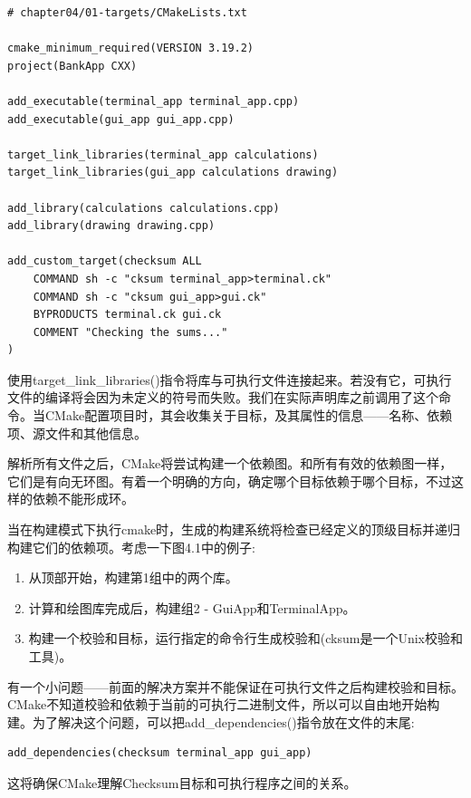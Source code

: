 \begin{lstlisting}[style=styleCMake]
# chapter04/01-targets/CMakeLists.txt

cmake_minimum_required(VERSION 3.19.2)
project(BankApp CXX)

add_executable(terminal_app terminal_app.cpp)
add_executable(gui_app gui_app.cpp)

target_link_libraries(terminal_app calculations)
target_link_libraries(gui_app calculations drawing)

add_library(calculations calculations.cpp)
add_library(drawing drawing.cpp)

add_custom_target(checksum ALL
	COMMAND sh -c "cksum terminal_app>terminal.ck"
	COMMAND sh -c "cksum gui_app>gui.ck"
	BYPRODUCTS terminal.ck gui.ck
	COMMENT "Checking the sums..."
)
\end{lstlisting}

使用target\_link\_libraries()指令将库与可执行文件连接起来。若没有它，可执行文件的编译将会因为未定义的符号而失败。我们在实际声明库之前调用了这个命令。当CMake配置项目时，其会收集关于目标，及其属性的信息——名称、依赖项、源文件和其他信息。

解析所有文件之后，CMake将尝试构建一个依赖图。和所有有效的依赖图一样，它们是有向无环图。有着一个明确的方向，确定哪个目标依赖于哪个目标，不过这样的依赖不能形成环。

当在构建模式下执行cmake时，生成的构建系统将检查已经定义的顶级目标并递归构建它们的依赖项。考虑一下图4.1中的例子:

\begin{enumerate}
\item 
从顶部开始，构建第1组中的两个库。

\item 
计算和绘图库完成后，构建组2 - GuiApp和TerminalApp。

\item 
构建一个校验和目标，运行指定的命令行生成校验和(cksum是一个Unix校验和工具)。
\end{enumerate}

有一个小问题——前面的解决方案并不能保证在可执行文件之后构建校验和目标。CMake不知道校验和依赖于当前的可执行二进制文件，所以可以自由地开始构建。为了解决这个问题，可以把add\_dependencies()指令放在文件的末尾:

\begin{lstlisting}[style=styleCMake]
add_dependencies(checksum terminal_app gui_app)
\end{lstlisting}

这将确保CMake理解Checksum目标和可执行程序之间的关系。


